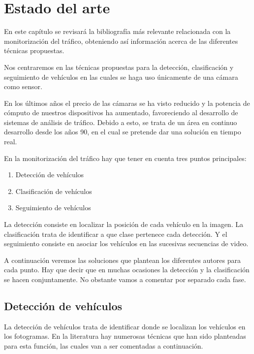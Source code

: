 \chapter{Estado del arte}\label{cap.estado}

En este capítulo se revisará la bibliografía más relevante relacionada con la monitorización del tráfico, obteniendo así información acerca de las diferentes técnicas propuestas. 

Nos centraremos en las técnicas propuestas para la detección, clasificación y seguimiento de vehículos en las cuales se haga uso únicamente de una cámara como sensor. 

En los últimos años el precio de las cámaras se ha visto reducido y la potencia de cómputo de nuestros dispositivos ha aumentado, favoreciendo al desarrollo de sistemas de análisis de tráfico. Debido a esto, se trata de un área en continuo desarrollo desde los años 90, en el cual se pretende dar una solución en tiempo real. 

En la monitorización del tráfico hay que tener en cuenta tres puntos principales:
\begin{enumerate}
    \item Detección de vehículos
    \item Clasificación de vehículos
    \item Seguimiento de vehículos
\end{enumerate}

La detección consiste en localizar la posición de cada vehículo en la imagen. La clasificación trata de identificar a que clase pertenece cada detección. Y el seguimiento consiste en asociar los vehículos en las sucesivas secuencias de video.

A continuación veremos las soluciones que plantean los diferentes autores para cada punto. Hay que decir que en muchas ocasiones la detección y la clasificación se hacen conjuntamente. No obstante vamos a comentar por separado cada fase.

\section{Detección de vehículos} \label{ap.deteccion_vehiculos}

La detección de vehículos trata de identificar donde se localizan los vehículos en los fotogramas. En la literatura hay numerosas técnicas que han sido planteadas para esta función, las cuales van a ser comentadas a continuación. 

